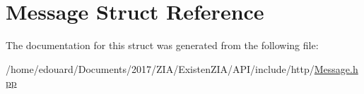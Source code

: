 \hypertarget{structMessage}{}\section{Message Struct Reference}
\label{structMessage}


The documentation for this struct was generated from the following file\+:\begin{DoxyCompactItemize}
\item 
/home/edouard/\+Documents/2017/\+Z\+I\+A/\+Existen\+Z\+I\+A/\+A\+P\+I/include/http/\mbox{\hyperlink{Message_8hpp}{Message.\+hpp}}\end{DoxyCompactItemize}
